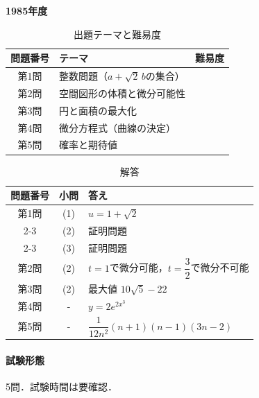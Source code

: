 \documentclass[../../main.tex]{subfiles}
\begin{document}
\begin{center}
  {\fontsize{48pt}{58pt}\selectfont \textbf{1985}\normalsize\textbf{年度}}
\end{center}

\begin{table}[htb]
  \centering
  \caption{出題テーマと難易度}
  \begin{tabular}{|c|p{9cm}|c|}
    \hline
    \textbf{問題番号} & \textbf{テーマ} & \textbf{難易度} \\
    \hline
    第1問 & 整数問題（$a+\sqrt{2}\,b$の集合） & \\
    \hline
    第2問 & 空間図形の体積と微分可能性 & \\
    \hline
    第3問 & 円と面積の最大化 & \\
    \hline
    第4問 & 微分方程式（曲線の決定） & \\
    \hline
    第5問 & 確率と期待値 & \\
    \hline
  \end{tabular}
\end{table}

\begin{table}[htb]
  \centering
  \caption{解答}
  \renewcommand{\arraystretch}{1.4}
  \begin{tabular}{|c|c|p{9cm}|}
    \hline
    \textbf{問題番号} & \textbf{小問} & \textbf{答え} \\
    \hline
    第1問 & (1) & $u=1+\sqrt{2}$ \\
    \cline{2-3}
    & (2) & 証明問題 \\
    \cline{2-3}
    & (3) & 証明問題 \\
    \hline
    第2問 & (2) & $t=1$で微分可能，$t=\dfrac{3}{2}$で微分不可能 \\
    \hline
    第3問 & (2) & 最大値 $10\sqrt{5}-22$ \\
    \hline
    第4問 & - & $y=2e^{2x^3}$ \\
    \hline
    第5問 & - & $\dfrac{1}{12n^2}(n+1)(n-1)(3n-2)$ \\
    \hline
  \end{tabular}
\end{table}

\paragraph{試験形態}
5問．試験時間は要確認．
\end{document}
